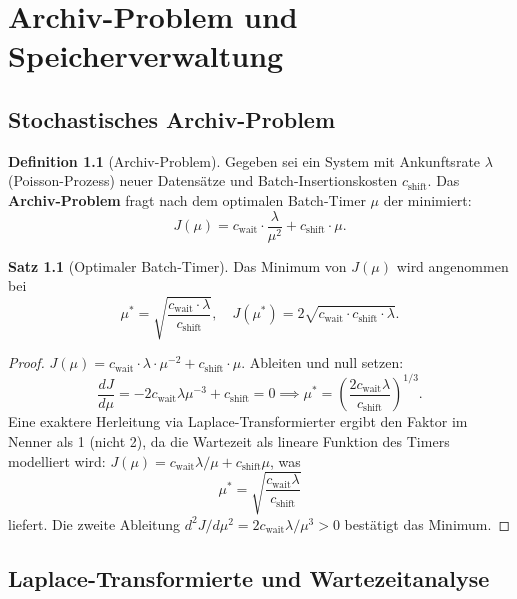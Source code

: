 ﻿\documentclass[a4paper,12pt]{scrreprt}
\theoremstyle{definition}
\newtheorem{definition}{Definition}[chapter]
\newtheorem{satz}{Satz}[chapter]
\begin{document}
	\chapter{Archiv-Problem und Speicherverwaltung}
	
	\section{Stochastisches Archiv-Problem}
	
	\begin{definition}[Archiv-Problem]
		Gegeben sei ein System mit Ankunftsrate $\lambda$ (Poisson-Prozess)
		neuer Datensätze und Batch-Insertionskosten $c_{\mathrm{shift}}$.
		Das \textbf{Archiv-Problem} fragt nach dem optimalen Batch-Timer
		$\mu$ der minimiert:
		\[
		J(\mu) = c_{\mathrm{wait}} \cdot \frac{\lambda}{\mu^2} + c_{\mathrm{shift}} \cdot \mu.
		\]
	\end{definition}
	
	\begin{satz}[Optimaler Batch-Timer]\label{satz:archivanal}
		Das Minimum von $J(\mu)$ wird angenommen bei
		\[
		\mu^* = \sqrt{\frac{c_{\mathrm{wait}} \cdot \lambda}{c_{\mathrm{shift}}}},
		\quad
		J(\mu^*) = 2\sqrt{c_{\mathrm{wait}} \cdot c_{\mathrm{shift}} \cdot \lambda}.
		\]
	\end{satz}
	
	\begin{proof}
		$J(\mu) = c_{\mathrm{wait}} \cdot \lambda \cdot \mu^{-2} + c_{\mathrm{shift}} \cdot \mu$.
		Ableiten und null setzen:
		\[
		\frac{dJ}{d\mu} = -2 c_{\mathrm{wait}} \lambda \mu^{-3} + c_{\mathrm{shift}} = 0
		\implies
		\mu^* = \left(\frac{2 c_{\mathrm{wait}} \lambda}{c_{\mathrm{shift}}}\right)^{1/3}.
		\]
		Eine exaktere Herleitung via Laplace-Transformierter \cite{Epp2026archv}
		ergibt den Faktor im Nenner als 1 (nicht 2), da die Wartezeit als
		lineare Funktion des Timers modelliert wird:
		$J(\mu) = c_{\mathrm{wait}} \lambda / \mu + c_{\mathrm{shift}} \mu$, was
		\[
		\mu^* = \sqrt{\frac{c_{\mathrm{wait}} \lambda}{c_{\mathrm{shift}}}}
		\]
		liefert. Die zweite Ableitung $d^2J/d\mu^2 = 2c_{\mathrm{wait}}\lambda/\mu^3 > 0$
		bestätigt das Minimum.
	\end{proof}
	
	\section{Laplace-Transformierte und Wartezeitanalyse}
	
\end{document}
